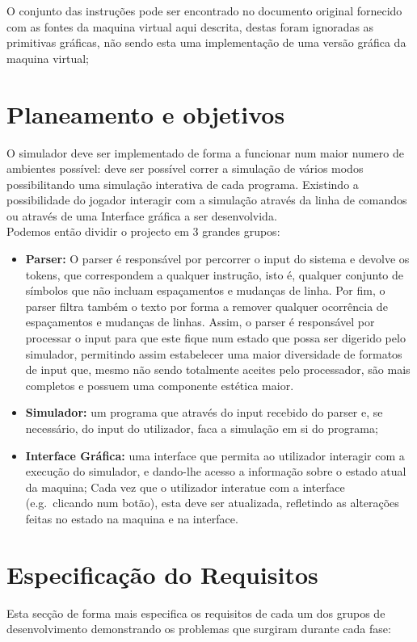 \documentclass{report}
\begin{document}
\quad O conjunto das instruções pode ser encontrado no documento original fornecido com as fontes da maquina virtual aqui descrita,
destas foram ignoradas as primitivas gráficas, não sendo esta uma implementação de uma versão gráfica da maquina virtual;

\section{Planeamento e objetivos}
\quad O simulador deve ser implementado de forma a funcionar num maior numero de ambientes possível:
deve ser possível correr a simulação de vários modos possibilitando uma simulação interativa de cada programa.
Existindo a possibilidade do jogador interagir com a simulação através da linha de comandos ou através de uma Interface
gráfica a ser desenvolvida.\\
\null\quad Podemos então dividir o projecto em 3 grandes grupos:
\begin{itemize}
	\item \textbf{Parser:} O parser é responsável por percorrer o input do sistema e devolve
	os tokens, que correspondem a qualquer instrução, isto é, qualquer conjunto de símbolos que não incluam
	espaçamentos e mudanças de linha.
	\quad Por fim, o parser filtra também o texto por forma a remover qualquer ocorrência de espaçamentos e mudanças de linhas.
	Assim, o parser é responsável por processar o input para que este fique num estado que possa ser digerido pelo simulador,
	permitindo assim estabelecer uma maior diversidade de formatos de input que, mesmo não sendo totalmente aceites
	pelo processador, são mais completos e possuem uma componente estética maior.


	\item \textbf{Simulador:} um programa que através do input recebido do parser e, se necessário, do input do utilizador,
	faca a simulação em si do programa;

	\item \textbf{Interface Gráfica:} uma interface que permita ao utilizador interagir com a execução do simulador,
	e dando-lhe acesso a informação sobre o estado atual da maquina;
	Cada vez que o utilizador interatue com a interface (e.g.\ clicando num botão), esta deve ser atualizada,
	refletindo as alterações feitas no estado na maquina e na interface.
\end{itemize}

\section{Especificação do Requisitos}
\quad Esta secção de forma mais especifica os requisitos de cada um dos grupos de desenvolvimento demonstrando os problemas que
surgiram durante cada fase:
\end{document}
